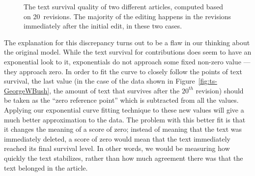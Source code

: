 \begin{figure}[tbph]
\centering
{}
\hspace{1ex}
\caption[The text survival quality graphs for two articles]{
  The text survival quality of two different articles, computed
  based on 20~revisions.
  The majority of the editing happens in the
  revisions immediately after the initial edit, in these two cases.
  \label{fig:ts-GWB-SCBB}
}
\end{figure}

The explanation for this discrepancy turns out to be a flaw in our
thinking about the original model.
While the text survival for contributions does seem to have an
exponential look to it, exponentials do not approach some fixed
non-zero value --- they approach zero.
In order to fit the curve to closely follow the points of text survival,
the last value
(in the case of the data shown in Figure~\ref{fig:ts-GeorgeWBush},
the amount of text that survives after the $20^{th}$ revision)
should be taken as the ``zero reference point'' which is subtracted
from all the values.
Applying our exponential curve fitting technique to these new values
will give a much better approximation to the data.
The problem with this better fit is that it changes the meaning of
a score of zero; instead of meaning that the text was immediately deleted,
a score of zero would mean that the text immediately reached its
final survival level.
In other words, we would be measuring how quickly the text stabilizes,
rather than how much agreement there was that the text belonged in
the article.


